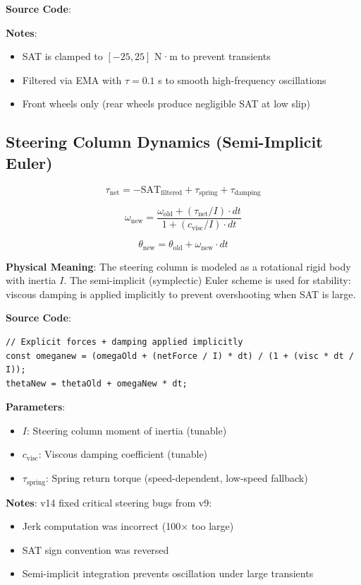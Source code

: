 \textbf{Source Code}: 

\textbf{Notes}:
\begin{itemize}
  \item SAT is clamped to $[-25, 25]$ N·m to prevent transients
  \item Filtered via EMA with $\tau = 0.1$ s to smooth high-frequency oscillations
  \item Front wheels only (rear wheels produce negligible SAT at low slip)
\end{itemize}

\subsection{Steering Column Dynamics (Semi-Implicit Euler)}

\begin{equation}
  \tau_{\text{net}} = -\text{SAT}_{\text{filtered}} + \tau_{\text{spring}} + \tau_{\text{damping}}
  \label{eq:steering-torque}
\end{equation}

\begin{equation}
  \omega_{\text{new}} = \frac{\omega_{\text{old}} + (\tau_{\text{net}} / I) \cdot dt}{1 + (c_{\text{visc}} / I) \cdot dt}
  \label{eq:semi-implicit-steering}
\end{equation}

\begin{equation}
  \theta_{\text{new}} = \theta_{\text{old}} + \omega_{\text{new}} \cdot dt
  \label{eq:steering-angle-update}
\end{equation}

\textbf{Physical Meaning}: The steering column is modeled as a rotational rigid body with inertia $I$. The semi-implicit (symplectic) Euler scheme is used for stability: viscous damping is applied implicitly to prevent overshooting when SAT is large.

\textbf{Source Code}: 

\begin{lstlisting}[caption={Semi-implicit steering integration}]
// Explicit forces + damping applied implicitly
const omeganew = (omegaOld + (netForce / I) * dt) / (1 + (visc * dt / I));
thetaNew = thetaOld + omegaNew * dt;
\end{lstlisting}

\textbf{Parameters}:
\begin{itemize}
  \item $I$: Steering column moment of inertia (tunable)
  \item $c_{\text{visc}}$: Viscous damping coefficient (tunable)
  \item $\tau_{\text{spring}}$: Spring return torque (speed-dependent, low-speed fallback)
\end{itemize}

\textbf{Notes}: v14 fixed critical steering bugs from v9:
\begin{itemize}
  \item Jerk computation was incorrect (100× too large)
  \item SAT sign convention was reversed
  \item Semi-implicit integration prevents oscillation under large transients
\end{itemize}

\newpage
